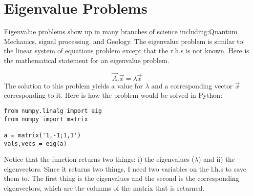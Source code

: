 \section{Eigenvalue Problems}
Eigenvalue problems show up in many branches of science
including:Quantum Mechanics, signal processing, and Geology. The
eigenvalue problem is similar to the linear system of equations
problem except that the r.h.s is not known.  Here is the mathematical
statement for an eigenvalue problem.

\begin{equation}
\vec{A}.\vec{x} = \lambda \vec{x}
\end{equation}
The solution to this problem yields a value for $\lambda$ and a
corresponding vector $\vec{x}$ corresponding to it.  Here is how the
problem would be solved in Python:
\begin{Verbatim}
from numpy.linalg import eig
from numpy import matrix

a = matrix('1,-1;1,1')
vals,vecs = eig(a)
\end{Verbatim}
Notice that the function  returns two things: i) the
eigenvalues ($\lambda$) and ii) the eigenvectors.  Since it returns
two things, I need two variables on the l.h.s to save them to.  The
first thing is the eigenvalues and the second is the corresponding
eigenvectors, which are the columns of the matrix that is returned.
